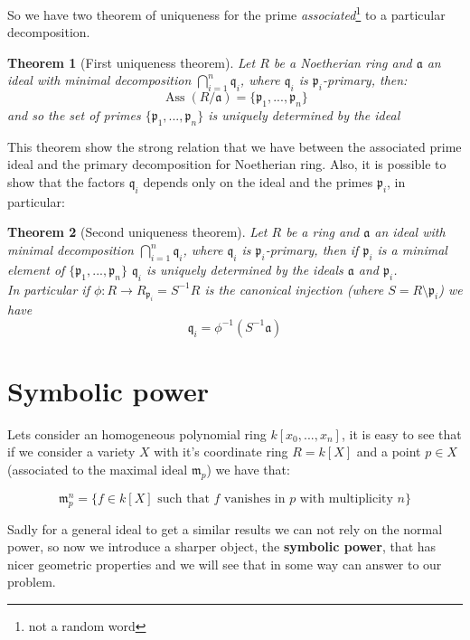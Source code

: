 \documentclass[notitlepage, a4]{book}
\theoremstyle{plain}
\newtheorem{teo}{Theorem}[section]
\theoremstyle{remark}
\theoremstyle{definition}
\newcommand{\p}{\mathfrak{p}}
\newcommand{\q}{\mathfrak{q}}
\newcommand{\mm}{\mathfrak{m}}
\newcommand{\A}{\mathfrak{a}}
\DeclareMathOperator{\Ass}{Ass}
\newcounter{que}
\begin{document}
So we have two theorem of uniqueness for the prime \textit{associated}\footnote{not a random word} to a particular decomposition. 

\begin{teo}[First uniqueness theorem]
Let $ R $ be a Noetherian ring and $ \A $ an ideal with minimal decomposition $ \bigcap_{i=1}^n \q_i $, where $ \q_i $ is $ \p_i $-primary, then:
\[ \Ass(R/ \A) = \{ \p_1 , ... , \p_n \} \]
and so the set of primes $ \{ \p_1 , ... , \p_n \} $ is uniquely determined by the ideal

\end{teo}

This theorem show the strong relation that we have between the associated prime ideal and the primary decomposition for Noetherian ring. Also, it is possible to show that the factors $ \q_i $ depends only on the ideal and the primes $ \p_i $, in particular:

\begin{teo}[Second uniqueness theorem]
Let $ R $ be a ring and $ \A $ an ideal with minimal decomposition $ \bigcap_{i=1}^n \q_i $, where $ \q_i $ is $ \p_i $-primary, then if $ \p_i $ is a minimal element of $ \{ \p_1 , ... , \p_n \} $ $ \q_i $ is uniquely determined by the ideals $ \A $ and $ \p_i $.\\
In particular if $ \phi : R \to R_{\p_i} = S^{-1} R$ is the canonical injection (where $ S = R \setminus \p_i $) we have
\[ 
\q_i = \phi ^{-1} ( S^{-1} \A  )
\]

\end{teo}


\section{Symbolic power}

	Lets consider an homogeneous polynomial ring $ k[x_0 , ... , x_n] $, it is easy to see that if we consider a variety $ X $ with it's coordinate ring $ R = k[X] $ and a point $ p \in X $ (associated to the maximal ideal $ \mm_p $)  we have that:
	
	\begin{equation}\label{eq:max_pow}
		\mm_p^n = \{ f \in k[X] \text{ such that } f \text{ vanishes in } p \text{ with multiplicity } n\}
	\end{equation}
	
	Sadly for a general ideal to get a similar results we can not rely on the normal power, so now we introduce a sharper object, the \textbf{symbolic power}, that has nicer geometric properties and we will see that in some way can answer to our problem. %
	
\end{document}
